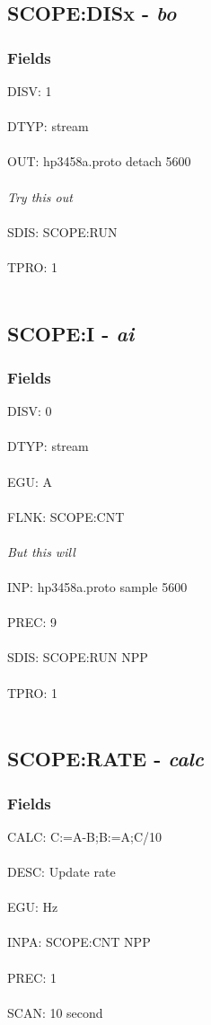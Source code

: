 \documentclass[12pt]{article}
\begin{document}
\subsection{SCOPE:DISx - \textit{bo}}
\subsubsection{Fields}
DISV: 1\\\\ DTYP: stream\\\\ OUT: hp3458a.proto detach 5600\\\\ \textit{Try this out}\\\\ 
SDIS: SCOPE:RUN\\\\ TPRO: 1\\\\ \newpage
\subsection{SCOPE:I - \textit{ai}}
\subsubsection{Fields}
DISV: 0\\\\ DTYP: stream\\\\ EGU: A\\\\ FLNK: SCOPE:CNT\\\\ \textit{But this will}\\\\ 
INP: hp3458a.proto sample 5600\\\\ PREC: 9\\\\ SDIS: SCOPE:RUN NPP\\\\ TPRO: 1\\\\ \newpage
\subsection{SCOPE:RATE - \textit{calc}}
\subsubsection{Fields}
CALC: C:=A-B;B:=A;C\slash 10\\\\ DESC: Update rate\\\\ EGU: Hz\\\\ INPA: SCOPE:CNT NPP\\\\ PREC: 1\\\\ SCAN: 10 second\\\\ 
\end{document}
